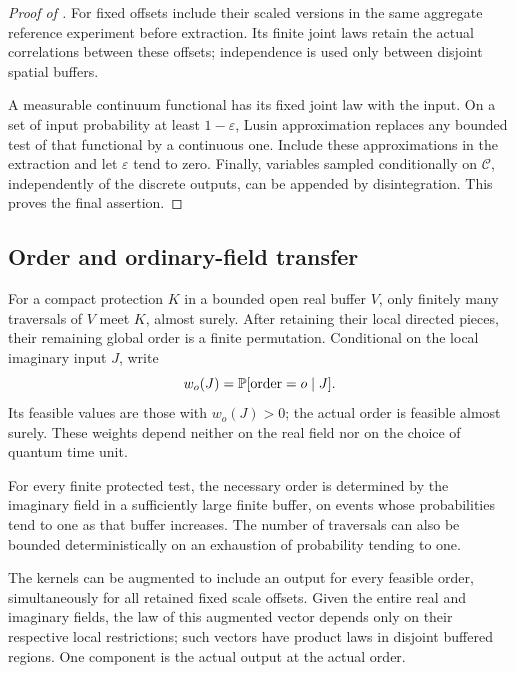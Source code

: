 \begin{proof}[Proof of ]
For fixed offsets include their scaled versions in the same aggregate
reference experiment before extraction. Its finite joint laws retain
the actual correlations between these offsets; independence is used
only between disjoint spatial buffers.

A measurable continuum functional has its fixed joint law with the
input. On a set of input probability at least \(1-\varepsilon\),
Lusin approximation replaces any bounded test of that functional by
a continuous one. Include these approximations in the extraction and
let \(\varepsilon\) tend to zero. Finally, variables sampled
conditionally on \(\mathcal C\), independently of the discrete outputs,
can be appended by disintegration. This proves the final assertion.
\end{proof}

\subsection{Order and ordinary-field transfer}

\begin{lemma}\label{ker:finite-order}
For a compact protection \(K\) in a bounded open real buffer \(V\),
only finitely many traversals of \(V\) meet \(K\), almost surely.
After retaining their local directed pieces, their remaining global
order is a finite permutation.  Conditional on the local imaginary
input \(J\), write
\[
 w_o(J)=\mathbb P[\text{order}=o\mid J].
\]
Its feasible values are those with \(w_o(J)>0\); the actual order is
feasible almost surely.  These weights depend neither on the real
field nor on the choice of quantum time unit.

For every finite protected test, the necessary order is determined
by the imaginary field in a sufficiently large finite buffer, on
events whose probabilities tend to one as that buffer increases.
The number of traversals can also be bounded deterministically on
an exhaustion of probability tending to one.

The kernels can be augmented to include an output for every feasible
order, simultaneously for all retained fixed scale offsets.  Given
the entire real and imaginary fields, the law of this augmented
vector depends only on their respective local restrictions; such
vectors have product laws in disjoint buffered regions.  One component
is the actual output at the actual order.
\end{lemma}

